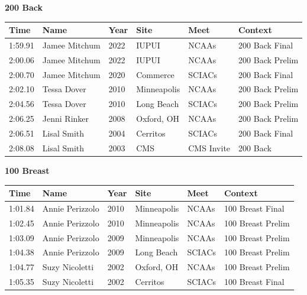 \noindent\begin{minipage}[t]{0.98\textwidth}
\centering
\textbf{\textcolor{teamprimary}{200 Back}}\par
\vspace{0.5em}
\centering
\small
\renewcommand{\arraystretch}{1.0}
\setlength{\tabcolsep}{4pt}
\begin{tabular}{@{}p{2.0cm}p{3.2cm}p{1.2cm}p{2.0cm}p{2.0cm}p{2.5cm}@{}}
\toprule
\textbf{Time} & \textbf{Name} & \textbf{Year} & \textbf{Site} & \textbf{Meet} & \textbf{Context} \\
\midrule
1:59.91 & Jamee Mitchum & 2022 & IUPUI & NCAAs & 200 Back Final \\
2:00.06 & Jamee Mitchum & 2022 & IUPUI & NCAAs & 200 Back Prelim \\
2:00.70 & Jamee Mitchum & 2020 & Commerce & SCIACs & 200 Back Final \\
2:02.10 & Tessa Dover & 2010 & Minneapolis & NCAAs & 200 Back Prelim \\
2:04.56 & Tessa Dover & 2010 & Long Beach & SCIACs & 200 Back Prelim \\
2:06.25 & Jenni Rinker & 2008 & Oxford, OH & NCAAs & 200 Back Prelim \\
2:06.51 & Lisal Smith & 2004 & Cerritos & SCIACs & 200 Back Final \\
2:08.08 & Lisal Smith & 2003 & CMS & CMS Invite & 200 Back \\
\bottomrule
\end{tabular}
\end{minipage}
\vspace{1.2em}
\noindent\begin{minipage}[t]{0.98\textwidth}
\centering
\textbf{\textcolor{teamprimary}{100 Breast}}\par
\vspace{0.5em}
\centering
\small
\renewcommand{\arraystretch}{1.0}
\setlength{\tabcolsep}{4pt}
\begin{tabular}{@{}p{2.0cm}p{3.2cm}p{1.2cm}p{2.0cm}p{2.0cm}p{2.5cm}@{}}
\toprule
\textbf{Time} & \textbf{Name} & \textbf{Year} & \textbf{Site} & \textbf{Meet} & \textbf{Context} \\
\midrule
1:01.84 & Annie Perizzolo & 2010 & Minneapolis & NCAAs & 100 Breast Final \\
1:02.45 & Annie Perizzolo & 2010 & Minneapolis & NCAAs & 100 Breast Prelim \\
1:03.09 & Annie Perizzolo & 2009 & Minneapolis & NCAAs & 100 Breast Prelim \\
1:04.38 & Annie Perizzolo & 2009 & Long Beach & SCIACs & 100 Breast Prelim \\
1:04.77 & Suzy Nicoletti & 2002 & Oxford, OH & NCAAs & 100 Breast Prelim \\
1:05.35 & Suzy Nicoletti & 2002 & Cerritos & SCIACs & 100 Breast Final \\
\bottomrule
\end{tabular}
\end{minipage}
